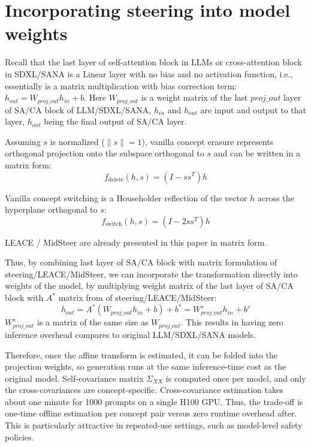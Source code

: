 \clearpage
\section{Incorporating steering into model weights}
\label{sec:suppl_matrix_form}

Recall that the last layer of self-attention block in LLMs or cross-attention block in SDXL/SANA is a Linear layer with no bias and no activation function, i.e., essentially is a matrix multiplication with bias correction term:
$h_{out} = W_{proj\_out}h_{in} + b.$
Here $W_{proj\_out}$ is a weight matrix of the last $proj\_out$ layer of SA/CA block of LLM/SDXL/SANA, $h_{in}$ and $h_{out}$ are input and output to that layer, $h_{out}$ being the final output of SA/CA layer.

    Assuming $s$ is normalized ($\|s\|=1$), vanilla concept erasure represents orthogonal projection onto the subspace orthogonal to $s$ and can be written in a matrix form:
    \begin{equation}
	    f_{\text{delete}}(h, s) = (I - ss^T)h 
	    \label{eq:casteer_erasure_matrix}
	\end{equation}
	
	Vanilla concept switching is a Householder reflection of the vector $h$ across the hyperplane orthogonal to $s$:
	\begin{equation}
		f_{\text{switch}}(h, s) = (I - 2ss^T)h  
		\label{eq:casteer_switch_matrix}
	\end{equation}
	
	LEACE / MidSteer are already presented in this paper in matrix form.

Thus, by combining last layer of SA/CA block with matrix formulation of steering/LEACE/MidSteer, we can incorporate the transformation directly into weights of the model, by multiplying weight matrix of the last layer of SA/CA block with $A^*$ matrix from of steering/LEACE/MidSteer:
\begin{equation}
    h_{out} = A^*(W_{proj\_out}h_{in} + b)  + b^* = W^{s}_{proj\_out}h_{in}  + b^s
\end{equation}
$W^{s}_{proj\_out}$ is a matrix of the same size as $W_{proj\_out}$. This results in having zero inference overhead compares to original LLM/SDXL/SANA models.

Therefore, once the affine transform is estimated, it can be folded into the projection weights, so generation runs at the same inference-time cost as the original model. Self-covariance matrix $\Sigma_{XX}$ is computed once per model, and only the cross-covariances are concept-specific. Cross-covariance estimation takes about one minute for 1000 prompts on a single H100 GPU. Thus, the trade-off is one-time offline estimation per concept pair versus zero runtime overhead after. This is particularly attractive in repeated-use settings, such as model-level safety policies.

